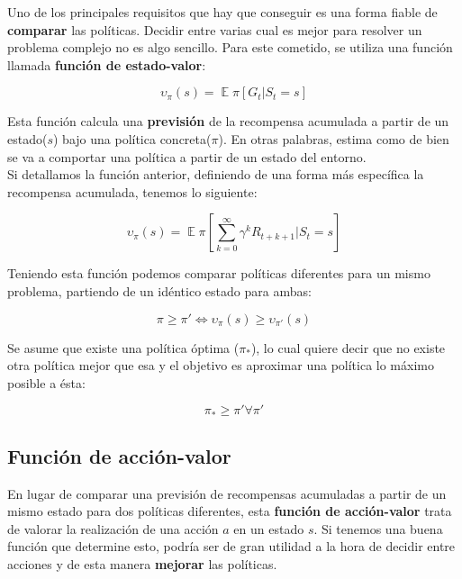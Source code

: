 \documentclass[11pt,fleqn]{book} %
\DeclareMathOperator*{\E}{\mathbb{E}}
\begin{document}
Uno de los principales requisitos que hay que conseguir es una forma fiable de \textbf{comparar} las políticas. Decidir entre varias cual es mejor para resolver un problema complejo no es algo sencillo. Para este cometido, se utiliza una función llamada \textbf{función de estado-valor}: 

\begin{equation*}
\upsilon_\pi(s)=\E\pi[G_t|S_t=s]
\end{equation*}

Esta función calcula una \textbf{previsión} de la recompensa acumulada a partir de un estado($s$) bajo una política concreta($\pi$). En otras palabras, estima como de bien se va a comportar una política a partir de un estado del entorno.\\

Si detallamos la función anterior, definiendo de una forma más específica la recompensa acumulada, tenemos lo siguiente:

\begin{equation*}
\upsilon_\pi(s)=\E\pi\left[\sum^\infty_{k=0}\gamma^kR_{t+k+1} | S_t=s\right]
\end{equation*}

Teniendo esta función podemos comparar políticas diferentes para un mismo problema, partiendo de un idéntico estado para ambas:

\begin{equation*}
\pi\geq\pi'\iff\upsilon_\pi(s)\geq\upsilon_{\pi'}(s) 
\end{equation*}

Se asume que existe una política óptima ($\pi_*$), lo cual quiere decir que no existe otra política mejor que esa y el objetivo es aproximar una política lo máximo posible a ésta:

\begin{equation*}
\pi_* \geq \pi' \forall \pi'
\end{equation*}

\subsection{Función de acción-valor}

En lugar de comparar una previsión de recompensas acumuladas a partir de un mismo estado para dos políticas diferentes, esta \textbf{función de acción-valor} trata de valorar la realización de una acción $a$ en un estado $s$. Si tenemos una buena función que determine esto, podría ser de gran utilidad a la hora de decidir entre acciones y de esta manera \textbf{mejorar} las políticas. \\
\end{document}
